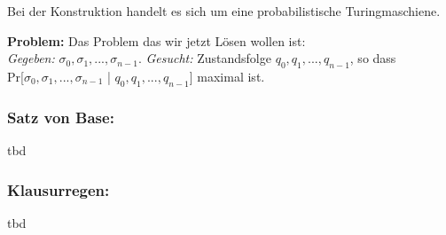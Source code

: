Bei der Konstruktion handelt es sich um eine probabilistische Turingmaschiene.

\textbf{Problem: } Das Problem das wir jetzt Lösen wollen ist:\\
\emph{Gegeben:} $\sigma_0, \sigma_1,...,  \sigma_{n-1}$.
\emph{Gesucht:} Zustandsfolge $q_0,q_1, ..., q_{n-1}$, so dass\\
Pr[$\sigma_0, \sigma_1, ... , \sigma_{n-1}$ | $q_0, q_1 , ... , q_{n-1}$] maximal ist.

\subsubsection{Satz von Base:}

tbd

\subsubsection{Klausurregen:}

tbd